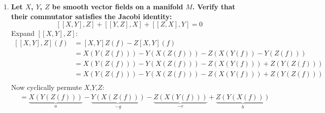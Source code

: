 \documentclass[9pt]{report}
\begin{document}
\begin{enumerate}
\begin{enumerate}
{    vector field}
  \[
    \begin{align}
    [v,w](f+g) &= v(w(f+g)) - w(v(f+g))\\
               &= v(w(f)+w(g))-w(v(f)+v(g))\\
               &= v(w(f))+v(w(g))-w(v(f))-w(v(g))\\
               &= v(w(f))-w(v(f))+v(w(g))-w(v(g))\\
               &= [v,w]f+[v,w]g\\
    \end{align}
  \]
  Therefore the commutator satisfies the linearity property in $v$. The same
  procedure can be applied symmetrically to $w$.
  \[
    \begin{align}
      [v,w](fg) &= v(w(fg)) - w(v(fg))\\
                &= v(w(f)g+fw(g)) - w(v(f)g+fv(g))\\
                &= v(w(f)g)+v(fw(g)) - w(v(f)g)-w(fv(g))\\
                &= v(w(f))g+w(f)v(g)+v(f)w(g)+fv(w(g))\\
                &-w(v(f))g-v(f)w(g)-w(f)v(g)-fw(v(g))\\
                &= v(w(f))g+f(v(w(g))-w(v(f))g-fw(v(g))\\
                &= f(v(w(g))-fw(v(g))+v(w(f))g-w(v(f))g\\
                &= f\Big((v(w(g))-w(v(g))\Big)+g\Big(v(w(f))-w(v(f))\Big)\\
                &= f[v,w](g)+g[v,w](f)
    \end{align}
  \]
  \item \textbf{Let $X$, $Y$, $Z$ be smooth vector fields on a manifold $M$. Verify
    that their commutator satisfies the Jacobi identity:}
  \[
    [[X,Y],Z] + [[Y,Z],X] + [[Z,X],Y] = 0
  \]
  Expand $[[X,Y],Z]$:
  \[
    \begin{align}
      [[X,Y],Z](f) &= [X,Y]Z(f)-Z[X,Y](f)\\
                   &= X(Y(Z(f)))-Y(X(Z(f)))-Z(X(Y(f))-Y(Z(f))) \\
                   &= X(Y(Z(f)))-Y(X(Z(f)))-Z(X(Y(f)))+Z(Y(Z(f))) \\
                   &= X(Y(Z(f)))-Y(X(Z(f)))-Z(X(Y(f)))+Z(Y(Z(f))) \\
    \end{align}
  \]
  Now cyclically permute $X$,$Y$,$Z$:
  \[
    \begin{align}
                   &= \underbrace{X(Y(Z(f)))}_a-\underbrace{Y(X(Z(f)))}_{-g}-\underbrace{Z(X(Y(f)))}_{-e}+\underbrace{Z(Y(X(f)))}_b \\

\end{align}\]
\end{enumerate}
\end{enumerate}
\end{document}
